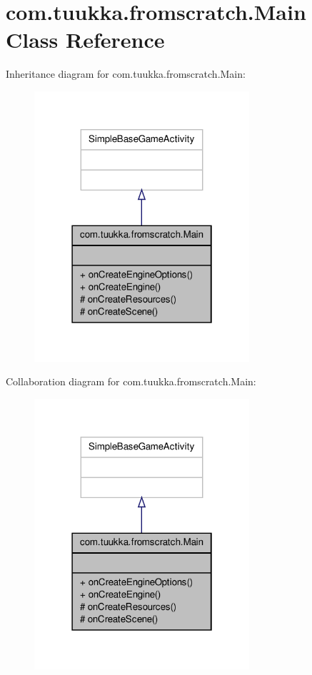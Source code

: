 \hypertarget{classcom_1_1tuukka_1_1fromscratch_1_1Main}{\section{com.\-tuukka.\-fromscratch.\-Main Class Reference}
\label{classcom_1_1tuukka_1_1fromscratch_1_1Main}
}


Inheritance diagram for com.\-tuukka.\-fromscratch.\-Main\-:
\nopagebreak
\begin{figure}[H]
\begin{center}
\leavevmode
\includegraphics[width=226pt]{classcom_1_1tuukka_1_1fromscratch_1_1Main__inherit__graph}
\end{center}
\end{figure}


Collaboration diagram for com.\-tuukka.\-fromscratch.\-Main\-:
\nopagebreak
\begin{figure}[H]
\begin{center}
\leavevmode
\includegraphics[width=226pt]{classcom_1_1tuukka_1_1fromscratch_1_1Main__coll__graph}
\end{center}
\end{figure}
